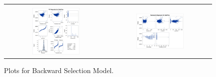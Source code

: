 \documentclass[11pt]{scrartcl} %
\begin{document}
\begin{figure}[H] %
	\centering
	\begin{tabular}{p{} p{}}
	\hline
	\multicolumn{1}{|c}{} &  \multicolumn{1}{c|}{} \\
		\multicolumn{1}{|c}{\includegraphics[width=0.48\textwidth]{../graphics/A2BWAss1}} &
		\multicolumn{1}{c|}{\includegraphics[width=0.48\textwidth]{../graphics/A2BWAss2}}\\
		\hline
	\end{tabular}		
	\caption{Plots for Backward Selection Model.}
	\label{fig:A2BWAss}
\end{figure}
\end{document}
